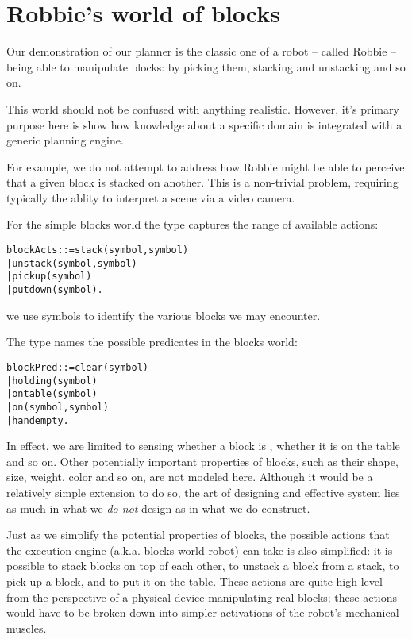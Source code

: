 \section{Robbie's world of blocks}
\label{strips:blocks}
Our demonstration of our planner is the classic one of a robot -- called Robbie -- being able to manipulate blocks: by picking them, stacking and unstacking and so on.
\begin{aside}
This world should not be confused with anything realistic. However, it's primary purpose here is show how knowledge about a specific domain is integrated with a generic planning engine.

For example, we do not attempt to address how Robbie might be able to perceive that a given block is stacked on another. This is a non-trivial problem, requiring typically the ablity to interpret a scene via a video camera.
\end{aside}
For the simple blocks world the  type captures the range of available actions:
\begin{alltt}
blockActs ::= stack(symbol,symbol)
    | unstack(symbol,symbol)
    | pickup(symbol)
    | putdown(symbol).
\end{alltt}
we use symbols to identify the various blocks we may encounter.

The  type names the possible predicates in the blocks world:
\begin{alltt}
blockPred ::= clear(symbol)
    | holding(symbol)
    | ontable(symbol)
    | on(symbol,symbol)
    | handempty.
\end{alltt}
In effect, we are limited to sensing whether a block is , whether it is on the table and so on. Other potentially important properties of blocks, such as their shape, size, weight, color and so on, are not modeled here. Although it would be a relatively simple extension to do so, the art of designing and effective system lies as much in what we \emph{do not} design as in what we do construct.

Just as we simplify the potential properties of blocks, the possible actions that the execution engine (a.k.a. blocks world robot) can take is also simplified: it is possible to stack blocks on top of each other, to unstack a block from a stack, to pick up a block, and to put it on the table. These actions are quite high-level from the perspective of a physical device manipulating real blocks; these actions would have to be broken down into simpler activations of the robot's mechanical muscles.

